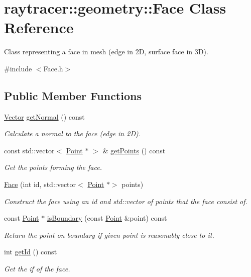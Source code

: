 \hypertarget{classraytracer_1_1geometry_1_1Face}{}\section{raytracer\+:\+:geometry\+:\+:Face Class Reference}
\label{classraytracer_1_1geometry_1_1Face}


Class representing a face in mesh (edge in 2D, surface face in 3D).  




{\ttfamily \#include $<$Face.\+h$>$}

\subsection*{Public Member Functions}
\begin{DoxyCompactItemize}
\item 
\hyperlink{classraytracer_1_1geometry_1_1Vector}{Vector} \hyperlink{classraytracer_1_1geometry_1_1Face_aac805c7505f21f9f6bf65c78cdd344de}{get\+Normal} () const
\begin{DoxyCompactList}\small\item\em Calculate a normal to the face (edge in 2D). \end{DoxyCompactList}\item 
const std\+::vector$<$ \hyperlink{classraytracer_1_1geometry_1_1Point}{Point} $\ast$ $>$ \& \hyperlink{classraytracer_1_1geometry_1_1Face_a4cd62fdb7f63bc1acee5fd9a7de233e1}{get\+Points} () const
\begin{DoxyCompactList}\small\item\em Get the points forming the face. \end{DoxyCompactList}\item 
\hyperlink{classraytracer_1_1geometry_1_1Face_ae6c1cac1c9f495b11dfa26cfec783fce}{Face} (int id, std\+::vector$<$ \hyperlink{classraytracer_1_1geometry_1_1Point}{Point} $\ast$$>$ points)
\begin{DoxyCompactList}\small\item\em Construct the face using an id and std\+::vector of points that the face consist of. \end{DoxyCompactList}\item 
const \hyperlink{classraytracer_1_1geometry_1_1Point}{Point} $\ast$ \hyperlink{classraytracer_1_1geometry_1_1Face_a4a71242ce34147b4260d9e62e9a1852c}{is\+Boundary} (const \hyperlink{classraytracer_1_1geometry_1_1Point}{Point} \&point) const
\begin{DoxyCompactList}\small\item\em Return the point on boundary if given point is reasonably close to it. \end{DoxyCompactList}\item 
int \hyperlink{classraytracer_1_1geometry_1_1Face_a83092455149193cca0cfb4e72809e6cf}{get\+Id} () const
\begin{DoxyCompactList}\small\item\em Get the if of the face. \end{DoxyCompactList}\end{DoxyCompactItemize}


